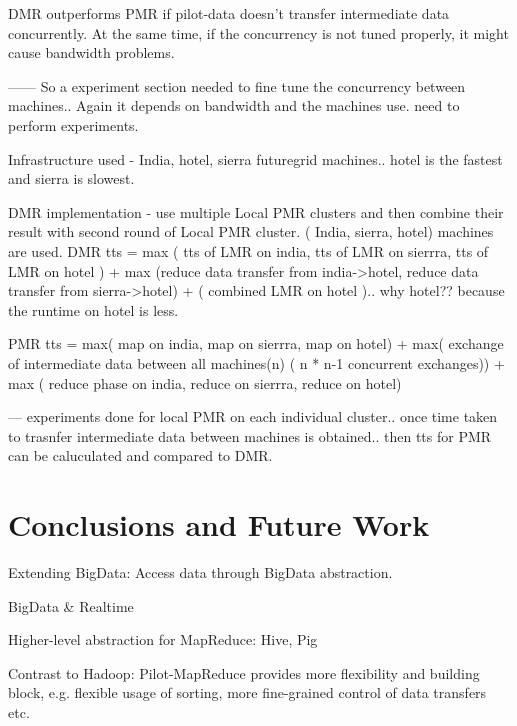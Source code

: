 \documentclass{acm_proc_article-sp}
\begin{document}
DMR outperforms PMR if pilot-data doesn't transfer intermediate data concurrently. At the same time, if the concurrency  is not tuned properly, it might cause bandwidth problems.

------ So a experiment section needed to fine tune the concurrency between machines.. Again it depends on bandwidth and the machines use. need to perform experiments.

Infrastructure used - India, hotel, sierra futuregrid machines.. hotel is the fastest and sierra is slowest.

DMR implementation - use multiple Local PMR clusters and then combine their result with second round of Local PMR cluster. ( India, sierra, hotel) machines are used.
DMR tts = max ( tts of LMR on india, tts of LMR  on sierrra, tts of LMR  on hotel ) + max (reduce data transfer from india->hotel, reduce data transfer from sierra->hotel) + ( combined LMR on hotel ).. why hotel?? because the runtime on hotel is less.  

PMR tts = max( map  on india, map on  sierrra, map on hotel) + max( exchange of intermediate data between all machines(n) ( n * n-1 concurrent exchanges)) + max ( reduce phase on  india, reduce on  sierrra, reduce on hotel)

--- experiments done for local PMR on each individual cluster.. once time taken to trasnfer intermediate data between machines is obtained.. then tts for PMR can be caluculated and compared to DMR.




\section{Conclusions and Future Work}


Extending BigData: Access data through BigData abstraction.

BigData \& Realtime

Higher-level abstraction for MapReduce: Hive, Pig


Contrast to Hadoop:
Pilot-MapReduce provides more flexibility and building block, e.g. flexible 
usage of sorting, more fine-grained control of data transfers etc.

%

%
%
\end{document}
